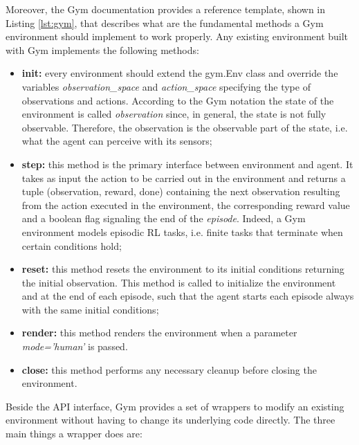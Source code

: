 Moreover, the Gym documentation provides a reference template, shown in Listing \ref{lst:gym}, that describes what are the fundamental methods a Gym environment should implement to work properly.
Any existing environment built with Gym implements the following methods:

\begin{center}
  \begin{minipage}{0.45\linewidth}
    
    \end{minipage}
\end{center}

\begin{itemize}
  \item \textbf{init:} every environment should extend the gym.Env class and override the variables \textit{observation\_space} and \textit{action\_space} specifying the type of observations and actions. According to the Gym notation the state of the environment is called \textit{observation} since, in general, the state is not fully observable. Therefore, the observation is the observable part of the state, i.e. what the agent can perceive with its sensors;
  \item \textbf{step:} this method is the primary interface between environment and agent. It takes as input the action to be carried out in the environment and returns a tuple (observation, reward, done) containing the next observation resulting from the action executed in the environment, the corresponding reward value and a boolean flag signaling the end of the \textit{episode}. Indeed, a Gym environment models episodic RL tasks, i.e. finite tasks that terminate when certain conditions hold;
  \item \textbf{reset:} this method resets the environment to its initial conditions returning the initial observation. This method is called to initialize the environment and at the end of each episode, such that the agent starts each episode always with the same initial conditions;
  \item \textbf{render:} this method renders the environment when a parameter \textit{mode='human'} is passed.
  \item \textbf{close:} this method performs any necessary cleanup before closing the environment.
\end{itemize}

Beside the API interface, Gym provides a set of wrappers to modify an existing environment without having to change its underlying code directly. The three main things a wrapper does are:

